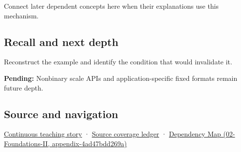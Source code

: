 Connect later dependent concepts here when their explanations use this mechanism.

\subsection{Recall and next depth}\label{appendix-1d0dbe8924cc-recall-and-next-depth}

Reconstruct the example and identify the condition that would invalidate it.

\textbf{Pending:} Nonbinary scale APIs and application-specific fixed formats remain future depth.

\subsection{Source and navigation}\label{appendix-1d0dbe8924cc-source-and-navigation}

\hyperref[01-foundations-i-ch001-choosing-what-information-to-keep]{Continuous teaching story} · \hyperref[appendix-fd090d982a15]{Source coverage ledger} · \href{../02-Foundations-II/main.pdf\#nameddest=appendix-4ad47bdd269a}{Dependency Map (02-Foundations-II, appendix-4ad47bdd269a)}
